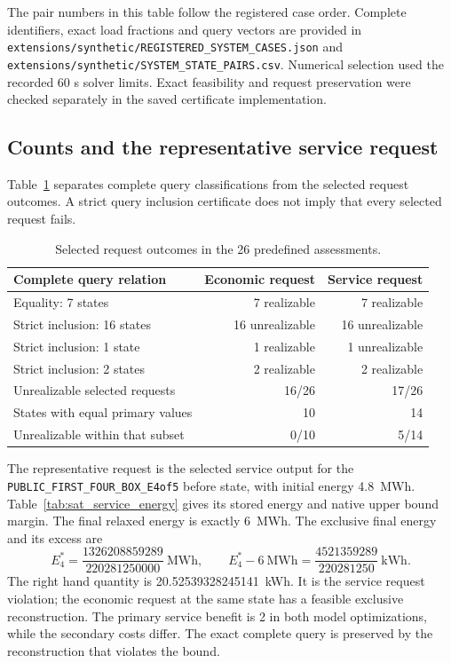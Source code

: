 The pair numbers in this table follow the registered case order. Complete
identifiers, exact load fractions and query vectors are provided in
\texttt{extensions/synthetic/REGISTERED\_SYSTEM\_CASES.json} and
\texttt{extensions/synthetic/SYSTEM\_STATE\_PAIRS.csv}. Numerical selection used
the recorded 60 s solver limits. Exact feasibility and request preservation
were checked separately in the saved certificate implementation.

\subsection{Counts and the representative service request}
Table~\ref{tab:sat_selected_counts} separates complete query classifications
from the selected request outcomes. A strict query inclusion certificate
does not imply that every selected request fails.

\begin{table}[htbp]
\caption{Selected request outcomes in the 26 predefined assessments.}
\label{tab:sat_selected_counts}
\begin{tabular}{@{}lrr@{}}\toprule
Complete query relation & Economic request & Service request\\\midrule
Equality: 7 states & 7 realizable & 7 realizable\\
Strict inclusion: 16 states & 16 unrealizable & 16 unrealizable\\
Strict inclusion: 1 state & 1 realizable & 1 unrealizable\\
Strict inclusion: 2 states & 2 realizable & 2 realizable\\\midrule
Unrealizable selected requests & 16/26 & 17/26\\
States with equal primary values & 10 & 14\\
Unrealizable within that subset & 0/10 & 5/14\\\bottomrule
\end{tabular}
\end{table}

The representative request is the selected service output for the
\texttt{PUBLIC\_FIRST\_FOUR\_BOX\_E4of5} before state, with initial energy
4.8~MWh. Table~\ref{tab:sat_service_energy} gives its stored energy and
native upper bound margin. The final relaxed energy is exactly 6~MWh.
The exclusive final energy and its excess are
\begin{equation}
E_4^*=\frac{1326208859289}{220281250000}\ \mathrm{MWh},
\qquad
E_4^*-6\ \mathrm{MWh}=\frac{4521359289}{220281250}\ \mathrm{kWh}.
\label{eq:sat_service_final}
\end{equation}
The right hand quantity is 20.52539328245141~kWh. It is the service request
violation; the economic request at the same state has a feasible exclusive
reconstruction. The primary service benefit is 2 in both model optimizations,
while the secondary costs differ. The exact complete query is preserved
by the reconstruction that violates the bound.


